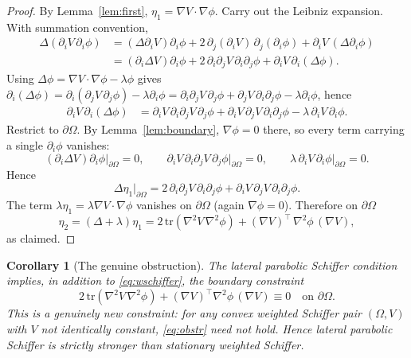 \documentclass[11pt]{article}
\newcommand{\Om}{\Omega}
\newcommand{\1}{\mathbf 1}
\newcommand{\tr}{\mathrm{tr}}
\newtheorem{cor}[lem]{Corollary}
\begin{document}
\begin{proof}
By Lemma~\ref{lem:first}, $\eta_1=\nabla V\cdot\nabla\phi$.
Carry out the Leibniz expansion. With summation convention,
\begin{align*}
    \Delta(\partial_iV\,\partial_i\phi)
    &= (\Delta\partial_iV)\partial_i\phi
        + 2\,\partial_j(\partial_iV)\,\partial_j(\partial_i\phi)
        + \partial_iV\,(\Delta\partial_i\phi)\\
    &= (\partial_i\Delta V)\partial_i\phi
        + 2\,\partial_i\partial_jV\,\partial_i\partial_j\phi
        + \partial_iV\,\partial_i(\Delta\phi).
\end{align*}
Using $\Delta\phi=\nabla V\cdot\nabla\phi-\lambda\phi$ gives
$\partial_i(\Delta\phi)=\partial_i(\partial_jV\,\partial_j\phi)
-\lambda\partial_i\phi
=\partial_i\partial_jV\,\partial_j\phi+\partial_jV\,\partial_i\partial_j\phi
-\lambda\partial_i\phi$, hence
\begin{align*}
    \partial_iV\,\partial_i(\Delta\phi)
    &= \partial_iV\,\partial_i\partial_jV\,\partial_j\phi
        + \partial_iV\,\partial_jV\,\partial_i\partial_j\phi
        - \lambda\,\partial_iV\,\partial_i\phi.
\end{align*}
Restrict to $\partial\Om$. By Lemma~\ref{lem:boundary},
$\nabla\phi=0$ there, so every term carrying a single $\partial_i\phi$
vanishes:
\[
    (\partial_i\Delta V)\partial_i\phi\big|_{\partial\Om}=0,\qquad
    \partial_iV\,\partial_i\partial_jV\,\partial_j\phi\big|_{\partial\Om}=0,\qquad
    \lambda\,\partial_iV\,\partial_i\phi\big|_{\partial\Om}=0.
\]
Hence
\[
    \Delta\eta_1|_{\partial\Om}
    = 2\,\partial_i\partial_jV\,\partial_i\partial_j\phi
        + \partial_iV\,\partial_jV\,\partial_i\partial_j\phi.
\]
The term $\lambda\eta_1=\lambda\nabla V\cdot\nabla\phi$ vanishes on
$\partial\Om$ (again $\nabla\phi=0$). Therefore on $\partial\Om$
\[
    \eta_2 = (\Delta+\lambda)\eta_1
    = 2\,\tr(\nabla^2V\,\nabla^2\phi)
    + (\nabla V)^\top\,\nabla^2\phi\,(\nabla V),
\]
as claimed.
\end{proof}

\begin{cor}[The genuine obstruction]\label{cor:obstr}
The lateral parabolic Schiffer condition implies, in addition to
\eqref{eq:wschiffer}, the boundary constraint
\begin{equation}
\label{eq:obstr}
    2\,\tr(\nabla^2V\,\nabla^2\phi)
    + (\nabla V)^\top\nabla^2\phi\,(\nabla V)\equiv 0
    \quad\text{on }\partial\Om.
\end{equation}
This is a genuinely new constraint: for any convex weighted Schiffer
pair $(\Om,V)$ with $V$ not identically constant, \eqref{eq:obstr}
need not hold. Hence \emph{lateral parabolic Schiffer is strictly
stronger than stationary weighted Schiffer.}
\end{cor}
\end{document}
